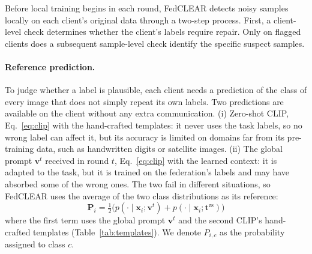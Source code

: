 \documentclass[runningheads]{llncs}
\begin{document}
Before local training begins in each round, FedCLEAR detects noisy samples locally on each client's original data through a two-step process. First, a client-level check determines whether the client's labels require repair. Only on flagged clients does a subsequent sample-level check identify the specific suspect samples.

\paragraph{Reference prediction.} To judge whether a label is plausible, each client needs a
prediction of the class of every image that does not simply repeat its own labels. Two predictions
are available on the client without any extra communication. (i) Zero-shot CLIP, Eq.~\eqref{eq:clip}
with the hand-crafted templates: it never uses the task labels, so no wrong label can affect it, but
its accuracy is limited on domains far from its pre-training data, such as handwritten digits or
satellite images. (ii) The global prompt $\mathbf{v}^{t}$ received in round $t$, Eq.~\eqref{eq:clip}
with the learned context: it is adapted to the task, but it is trained on the federation's labels and
may have absorbed some of the wrong ones. The two fail in different situations, so FedCLEAR uses the
average of the two class distributions as its reference:
\begin{equation}
\mathbf{P}_i = \tfrac{1}{2}\Big( p(\cdot \mid \mathbf{x}_i; \mathbf{v}^{t})
                              + p(\cdot \mid \mathbf{x}_i; \mathbf{t}^{\mathrm{zs}}) \Big)
\label{eq:ref}
\end{equation}
where the first term uses the global prompt $\mathbf{v}^{t}$ and the second CLIP's hand-crafted
templates (Table~\ref{tab:templates}). We denote $P_{i,c}$ as the probability assigned to class $c$. 



\end{document}
